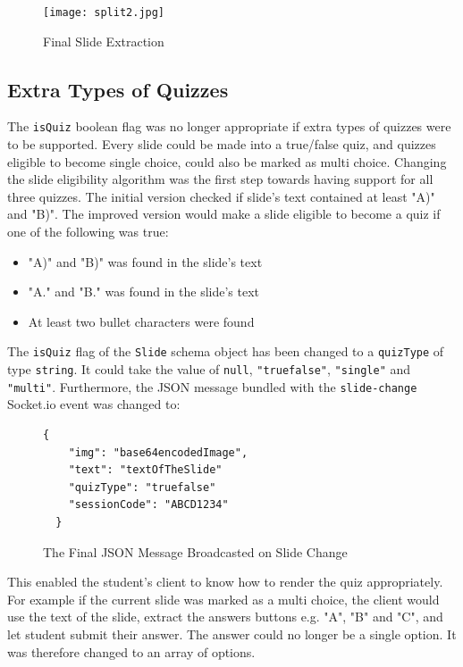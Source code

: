 \begin{figure}[h!]
    \centering
    \texttt{[image: split2.jpg]}
    \caption{Final Slide Extraction}
    \label{fig:split2}
\end{figure}

\newpage
\subsection{Extra Types of Quizzes}
The \texttt{isQuiz} boolean flag was no longer appropriate if extra types of quizzes were
to be supported. Every slide could be made into a true/false quiz, and quizzes eligible
to become single choice, could also be marked as multi choice. Changing the slide eligibility
algorithm was the first step towards having support for all three quizzes. The initial version
checked if slide's text contained at least "A)" and "B)". The improved version would make a
slide eligible to become a quiz if one of the following was true:

\begin{itemize}
  \item "A)" and "B)" was found in the slide's text
  \item "A." and "B." was found in the slide's text
  \item At least two bullet characters were found
\end{itemize}

The \texttt{isQuiz} flag of the \texttt{Slide} schema object has been changed to a \texttt{quizType}
of type \texttt{string}. It could take the value of \texttt{null}, \texttt{"truefalse"}, \texttt{"single"}
and \texttt{"multi"}. Furthermore, the JSON message bundled with the \texttt{slide-change} Socket.io
event was changed to:

\begin{figure}[h!]
  \begin{lstlisting}[basicstyle=\small]
  {
    "img": "base64encodedImage",
    "text": "textOfTheSlide"
    "quizType": "truefalse"
    "sessionCode": "ABCD1234"
  }
  \end{lstlisting}
  \caption{The Final JSON Message Broadcasted on Slide Change}
\end{figure}

This enabled the student's client to know how to render the quiz appropriately. For example if
the current slide was marked as a multi choice, the client would use the text of the slide,
extract the answers buttons e.g. "A", "B" and "C", and let student submit their answer.
The answer could no longer be a single option. It was therefore changed to an array of options.

